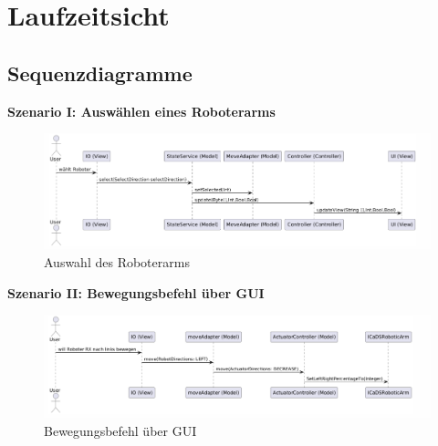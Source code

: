 
\chapter{Laufzeitsicht}

\section{Sequenzdiagramme}
\textbf{Szenario I: Auswählen eines Roboterarms}\\

\begin{figure}[h]
    \centering
    \includegraphics[width=0.8\linewidth]{diagrams/selectRobot_140725.png}
    \caption{Auswahl des Roboterarms}
    \label{fig:Auswahl}
\end{figure}

\clearpage\textbf{Szenario II: Bewegungsbefehl über GUI}\\

\begin{figure}[h]  
    \centering
    \includegraphics[width=0.8\linewidth]{diagrams/moveBefehl250625.png}
    \caption{Bewegungsbefehl über GUI}
    \label{fig:Bewegungsbefehl}
\end{figure}










